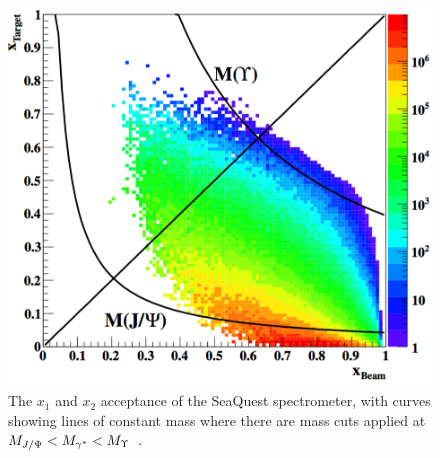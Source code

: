 \begin{figure}
	\centering
	\includegraphics[height=0.45\textheight]{figures/background/x1-x2-acceptance.png}
	\caption{The $x_1$ and $x_2$ acceptance of the SeaQuest spectrometer, with curves showing lines of constant mass where there are mass cuts applied at $M_{J/\Psi} < M_{\gamma^*} <M_\Upsilon$~\cite{sanftl:2014}.}
	\label{fig:x1-x2-acceptance}
\end{figure}


